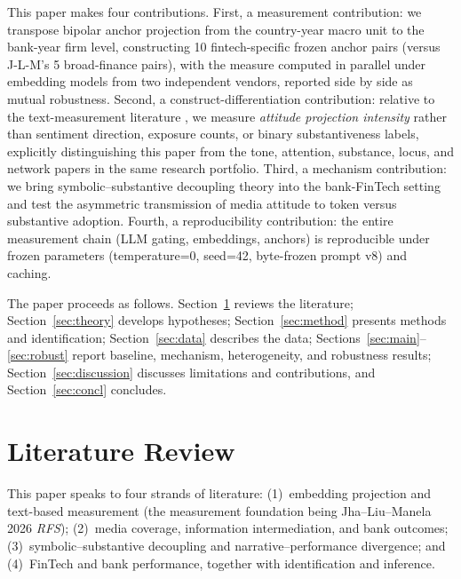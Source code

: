 This paper makes four contributions. First, a measurement
contribution: we transpose bipolar anchor projection from the
country-year macro unit to the bank-year firm level, constructing 10
fintech-specific frozen anchor pairs (versus J-L-M's 5 broad-finance
pairs), with the measure computed in parallel under embedding models
from two independent vendors, reported side by side as mutual
robustness. Second, a construct-differentiation contribution: relative
to the text-measurement literature
\parencite{gentzkow2019text,li2021culture,hoberg2016text}, we measure
\emph{attitude projection intensity} rather than sentiment direction,
exposure counts, or binary substantiveness labels, explicitly
distinguishing this paper from the tone, attention, substance, locus,
and network papers in the same research portfolio. Third, a mechanism
contribution: we bring symbolic--substantive decoupling theory
\parencite{westphal1994substance,fiss2006symbolic} into the
bank-FinTech setting and test the asymmetric transmission of media
attitude to token versus substantive adoption. Fourth, a
reproducibility contribution: the entire measurement chain (LLM gating,
embeddings, anchors) is reproducible under frozen parameters
(temperature=0, seed=42, byte-frozen prompt v8) and caching.

The paper proceeds as follows. Section~\ref{sec:lit} reviews the
literature; Section~\ref{sec:theory} develops hypotheses;
Section~\ref{sec:method} presents methods and identification;
Section~\ref{sec:data} describes the data;
Sections~\ref{sec:main}--\ref{sec:robust} report baseline, mechanism,
heterogeneity, and robustness results; Section~\ref{sec:discussion}
discusses limitations and contributions, and Section~\ref{sec:concl}
concludes.

\section{Literature Review}\label{sec:lit}
This paper speaks to four strands of literature: (1)~embedding
projection and text-based measurement (the measurement foundation being
Jha--Liu--Manela 2026 \emph{RFS}); (2)~media coverage, information
intermediation, and bank outcomes; (3)~symbolic--substantive decoupling
and narrative--performance divergence; and (4)~FinTech and bank
performance, together with identification and inference.


